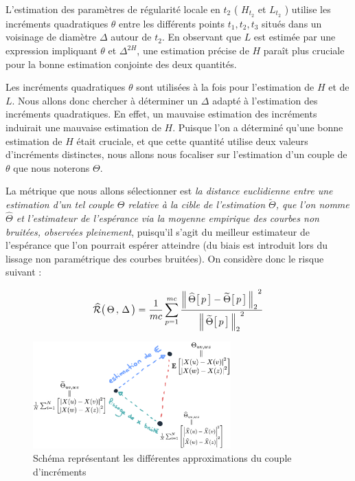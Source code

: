 
L'estimation des paramètres de régularité locale en $t_2$ ( $H_{t_2}$ et $L_{t_2}$ ) utilise les incréments quadratiques $\theta$ entre les différents points $t_1, t_2, t_3$ situés dans un voisinage de diamètre $\Delta$ autour de $t_2$.
En observant que $L$ est estimée par une expression impliquant $\theta$ et $\Delta^{2 H}$, une estimation précise de $H$ paraît plus cruciale pour la bonne estimation conjointe des deux quantités.


Les incréments quadratiques $\theta$ sont utilisées à la fois pour l'estimation de $H$ et de $L$. Nous allons donc chercher à déterminer un $\Delta$ adapté à l'estimation des incréments quadratiques. En effet, un mauvaise estimation des incréments induirait une mauvaise estimation de $H$. Puisque l'on a déterminé qu'une bonne estimation de $H$ était cruciale, et que cette quantité utilise deux valeurs d'incréments distinctes, nous allons nous focaliser sur l'estimation d'un couple de $\theta$ que nous noterons $\Theta$.

\bigskip

La métrique que nous allons sélectionner est \emph{la distance euclidienne entre une estimation d'un tel couple $\Theta$ relative à la cible de l'estimation $\widetilde \Theta$, que l'on nomme $\widehat \Theta$ et l'estimateur de l'espérance via la moyenne empirique des courbes non bruitées, observées pleinement}, puisqu'il s'agit du meilleur estimateur de l'espérance que l'on pourrait espérer atteindre (du biais est introduit lors du lissage non paramétrique des courbes bruitées). On considère donc le risque suivant :


\begin{equation}
	\widehat{\mathcal R} \bigl( \, \Theta \, , \, \Delta \, \bigr)
	=
	\frac 1 {mc} \sum\limits_{p=1}^{mc} \frac{{\distnorme 2 {\widehat \Theta\bigl[\, p \,\bigr]} {\widetilde \Theta \bigl[ \,p \,\bigr]}}^2}{{\norme 2 {\widetilde \Theta \bigl[ \,p \,\bigr]}}^2}
\end{equation}

\begin{figure}[H]
	\centering
	\includegraphics[width=0.68\textwidth]{Images/sketches/theta_biais.png}
	\caption{Schéma représentant les différentes approximations du couple d'incréments}
	\label{fig:sketch_theta_biais_corpus}
\end{figure}
